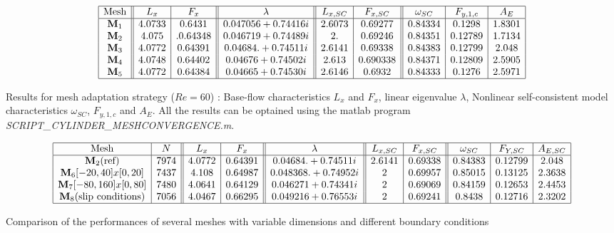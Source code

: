 \documentclass[twocolumn,10pt]{asme2ej}
\begin{document}
\begin{table}
$$
\begin{array}{|c||c|c||c||c|c||c|c|c|}
\hline
\mbox{Mesh} & L_x & F_x & \lambda & L_{x,SC} & F_{x,SC} & \omega_{SC}  & F_{y,1,c} & A_{E} \\
\hline
\mathbf{M}_1 & 4.0733 & 0.6431 	& 0.047056 + 0.74416i 		& 2.6073  &0.69277 		&  0.84334 & 0.1298 & 1.8301  \\
\mathbf{M}_2 & 4.075 &.  0.64348  	& 0.046719 + 0.74489i 		& 2.          & 0.69246 	& 0.84351 & 0.12789 & 1.7134 \\  
\mathbf{M}_3 & 4.0772 & 0.64391 	& 0.04684. +  0.74511i 		& 2.6141  & 0.69338 	& 0.84383 & 0.12799 & 2.048   \\ 
\mathbf{M}_4 & 4.0748 & 0.64402 	& 0.04676  + 0.74502i 		& 2.613 	& 0.690338 	& 0.84371 & 0.12809 & 2.5905 \\
\mathbf{M}_5 & 4.0772 & 0.64384	& 0.04665 + 0.74530i		& 2.6146 	& 0.6932		& 0.84333 & 0.1276	 & 2.5971 \\
\hline
\end{array}
$$
\caption{Results for mesh adaptation strategy ($Re = 60$) : Base-flow characteristics $L_x$ and $F_x$, linear eigenvalue $\lambda$, 
Nonlinear self-consistent model characteristics  $\omega_{SC}$, $F_{y,1,c}$ and $A_E$. All the results can be optained using the matlab program
{\em SCRIPT\_CYLINDER\_MESHCONVERGENCE.m}. }
\label{tab:conv2}
\end{table}





\begin{table}
$$
\begin{array}{|c|c||c|c||c||c|c||c|c|c|}
\hline
\mbox{Mesh} & N & L_x & F_x & \lambda & L_{x,SC} & F_{x,SC} & \omega_{SC}  & F_{Y,SC} & A_{E,SC} \\
\hline
\mathbf{M}_2 \mbox{(ref)} 	& 7974  	& 4.0772 & 0.64391 	& 0.04684. +  0.74511i 	& 2.6141  & 0.69338 	& 0.84383 & 0.12799 & 2.048   \\ 
\mathbf{M}_6 [-20,40]x[0,20] 	& 7437	&  4.108 & 0.64987 	& 0.048368. +  0.74952i 	& 2  & 0.69957 	& 0.85015 & 0.13125 & 2.3638   \\ 
\mathbf{M}_7 [-80,160]x[0,80] 	& 7480	& 4.0641 & 0.64129		& 0.046271 + 0.74341i 	& 2 	& 0.69069 	& 0.84159 & 0.12653 & 2.4453 \\
\mathbf{M}_8 \mbox{(slip conditions)}	 & 7056	& 4.0467 &0.66295		& 0.049216+0.76553i 	& 2 	& 0.69241		& 0.8438  & 0.12716	 & 2.3202 \\
\hline
\end{array}
$$
\caption{Comparison of the performances of several meshes with variable dimensions and different boundary conditions}
\label{tab:conv3}
\end{table}
\end{document}

